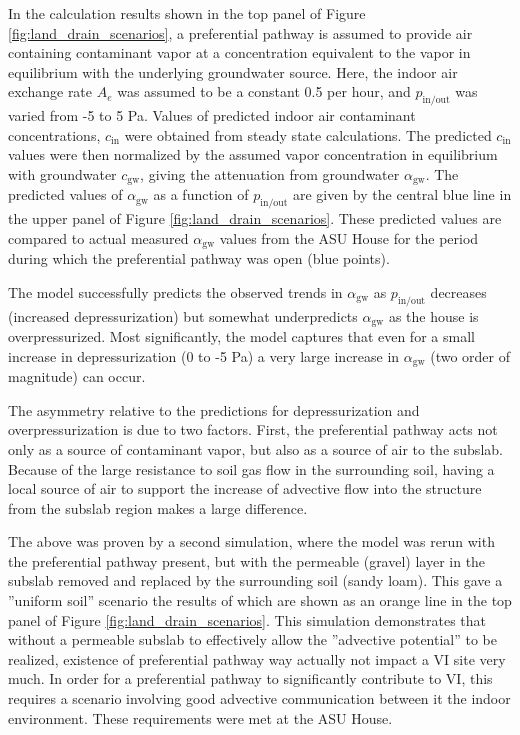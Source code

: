 \documentclass[journal=esthag,manuscript=article]{achemso}
\begin{document}
In the calculation results shown in the top panel of Figure \ref{fig:land_drain_scenarios}, a preferential pathway is assumed to provide air containing contaminant vapor at a concentration equivalent to the vapor in equilibrium with the underlying groundwater source.
Here, the indoor air exchange rate $A_e$ was assumed to be a constant 0.5 per hour, and $p_\mathrm{in/out}$ was varied from -5 to 5 Pa.
Values of predicted indoor air contaminant concentrations, $c_\mathrm{in}$ were obtained from steady state calculations.
The predicted $c_\mathrm{in}$ values were then normalized by the assumed vapor concentration in equilibrium with groundwater $c_\mathrm{gw}$, giving the attenuation from groundwater $\alpha_\mathrm{gw}$.
The predicted values of $\alpha_\mathrm{gw}$ as a function of $p_\mathrm{in/out}$ are given by the central blue line in the upper panel of Figure \ref{fig:land_drain_scenarios}.
These predicted values are compared to actual measured $\alpha_\mathrm{gw}$ values from the ASU House for the period during which the preferential pathway was open (blue points).\par

The model successfully predicts the observed trends in $\alpha_\mathrm{gw}$ as $p_\mathrm{in/out}$ decreases (increased depressurization) but somewhat underpredicts $\alpha_\mathrm{gw}$ as the house is overpressurized.
Most significantly, the model captures that even for a small increase in depressurization (0 to -5 Pa) a very large increase in $\alpha_\mathrm{gw}$ (two order of magnitude) can occur.\par

The asymmetry relative to the predictions for depressurization and overpressurization is due to two factors.
First, the preferential pathway acts not only as a source of contaminant vapor, but also  as a source of air to the subslab.
Because of the large resistance to soil gas flow in the surrounding soil, having a local source of air to support the increase of advective flow into the structure from the subslab region makes a large difference.\par

The above was proven by a second simulation, where the model was rerun with the preferential pathway present, but with the permeable (gravel) layer in the subslab removed and replaced by the surrounding soil (sandy loam).
This gave a ”uniform soil” scenario the results of which are shown as an orange line in the top panel of Figure \ref{fig:land_drain_scenarios}.
This simulation demonstrates that without a permeable subslab to effectively allow the ”advective potential” to be realized, existence of preferential pathway way actually not impact a VI site very much.
In order for a preferential pathway to significantly contribute to VI, this requires a scenario involving good advective communication between it the indoor environment.
These requirements were met at the ASU House.\par
\end{document}

